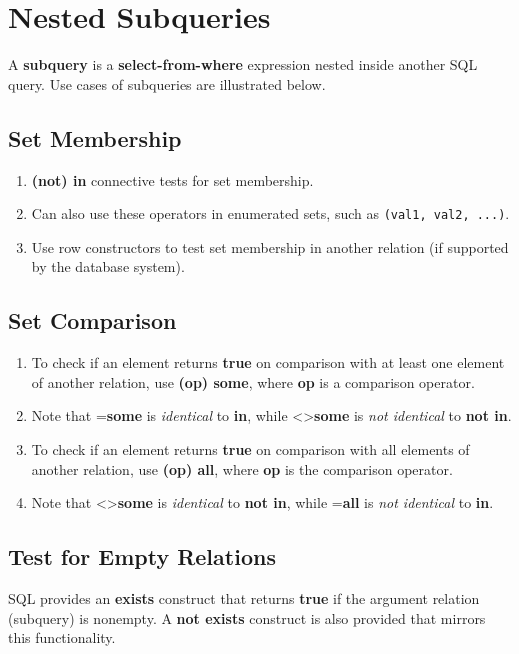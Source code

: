 \documentclass[journal,12pt,twocolumn]{IEEEtran}
\begin{document}
\section{Nested Subqueries}

A \textbf{subquery} is a \textbf{select-from-where} expression nested inside 
another SQL query. Use cases of subqueries are illustrated below.

\subsection{Set Membership}
\begin{enumerate}
    \item \textbf{(not) in} connective tests for set membership.
    \item Can also use these operators in enumerated sets, such as 
    \texttt{(val1, val2, ...)}.
    \item Use row constructors to test set membership in another relation 
    (if supported by the database system).
\end{enumerate}

\subsection{Set Comparison}
\begin{enumerate}
    \item To check if an element returns \textbf{true} on comparison with at 
    least one element of another relation, use \textbf{(op) some}, where 
    \textbf{op} is a comparison operator.
    \item Note that =\textbf{some} is \textit{identical} to \textbf{in}, 
    while <>\textbf{some} is \textit{not identical} to \textbf{not in}.
    \item To check if an element returns \textbf{true} on comparison with all 
    elements of another relation, use \textbf{(op) all}, where \textbf{op} is 
    the comparison operator.
    \item Note that <>\textbf{some} is \textit{identical} to \textbf{not in}, 
    while =\textbf{all} is \textit{not identical} to \textbf{in}.
\end{enumerate}

\subsection{Test for Empty Relations}

SQL provides an \textbf{exists} construct that returns \textbf{true} if the 
argument relation (subquery) is nonempty. A \textbf{not exists} construct is 
also provided that mirrors this functionality.
\end{document}
